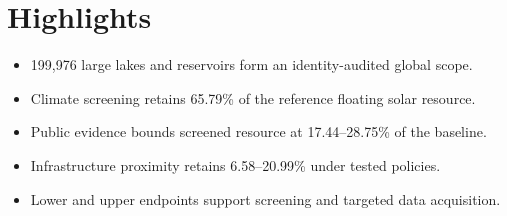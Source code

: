 \documentclass[11pt]{article}
\begin{document}
\section*{Highlights}
\begin{itemize}
\item 199,976 large lakes and reservoirs form an identity-audited global scope.
\item Climate screening retains 65.79\% of the reference floating solar resource.
\item Public evidence bounds screened resource at 17.44--28.75\% of the baseline.
\item Infrastructure proximity retains 6.58--20.99\% under tested policies.
\item Lower and upper endpoints support screening and targeted data acquisition.
\end{itemize}
\end{document}
